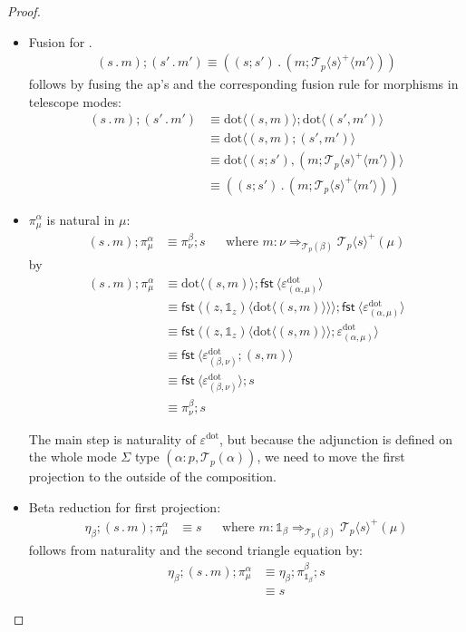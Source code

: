 \documentclass[10pt]{article}
\theoremstyle{definition}
\newcommand\dsd[1]{\ensuremath{\mathsf{#1}}}
\newcommand{\tcell}{\Rightarrow}
\newcommand{\app}[2]{\ensuremath{#1 \: #2}}
\newcommand{\sigmacl}[3]{\ensuremath{(#1{:}#2,#3)}}
\newcommand{\fst}[1]{\app{\dsd{fst}}{#1}}
\newcommand\TrPlus[2]{\ensuremath{{#1}^+(#2)}}
\newcommand\El[2]{\mathcal{T}_{#1}(#2)}
\newcommand\ApEl[2]{\mathcal{T}_{#1}\langle#2\rangle}
\newcommand\bdot[0]{\mathbin{.}}
\newcommand\ap[2]{\ensuremath{#1 \langle #2 \rangle }}
\newcommand\ApPlus[2]{\ensuremath{{#1}^+ \langle #2 \rangle }}
\newcommand{\sdot}{\ensuremath{\mathrm{dot}}}
\newcommand\One{\ensuremath{\mathds{1}}}
\begin{document}
\begin{proof}~
\begin{itemize}
\item Fusion for $.$
\begin{align}
\label{dot-fusion}
    (s \bdot m);(s' \bdot m') \equiv ((s;s') \bdot (m;\ApPlus{\ApEl{p}{s}} {m'}))
\end{align}
follows by fusing the ap's and the corresponding fusion rule for morphisms in telescope modes:
\begin{align*}
(s \bdot m);(s' \bdot m') &\equiv \ap{\sdot}{(s, m)} ; \ap{\sdot}{(s', m')} \\
&\equiv \ap{\sdot}{(s, m);(s', m')} \\
&\equiv \ap{\sdot}{(s;s'), (m;\ApPlus{\ApEl{p}{s}} {m'})} \\
&\equiv ((s;s') \bdot (m;\ApPlus{\ApEl{p}{s}} {m'}))
\end{align*}

\item $\pi^\alpha_\mu$ is natural in $\mu$:
  \begin{align}
  \label{pi-naturality}
  (s \bdot m); \pi^\alpha_\mu &\equiv \pi^\beta_\nu;s && \text{where }
  {m} : {\nu} \tcell_{\El{p}{\beta}} {\TrPlus{\ApEl{p}{s}}{\mu}}
  \end{align}
  by
  \begin{align*}
  (s \bdot m); \pi^\alpha_\mu 
  &\equiv \ap{\sdot}{(s, m)} ; \ap \fst {\varepsilon^\sdot_{(\alpha, \mu)}} \\  
  &\equiv \ap{\fst}{\ap{(z,\One_z)}{\ap{\sdot}{(s, m)}}} ; \ap \fst {\varepsilon^\sdot_{(\alpha, \mu)}} \\
  &\equiv \ap{\fst}{\ap{(z,\One_z)}{\ap{\sdot}{(s, m)}} ; \varepsilon^\sdot_{(\alpha, \mu)}}  \\
  &\equiv \ap{\fst}{\varepsilon^\sdot_{(\beta, \nu)}; (s, m) } \\
  &\equiv \ap{\fst}{\varepsilon^\sdot_{(\beta, \nu)}} ; s\\
  &\equiv \pi^\beta_\nu ; s
  \end{align*}

The main step is naturality of $\varepsilon^\sdot$, but because the adjunction
is defined on the whole mode $\Sigma$ type \sigmacl{\alpha}{p}{\El p
  \alpha}, we need to move the first projection to the outside of the
composition.
  
\item Beta reduction for first projection:
  \begin{align}
\label{beta-pi}
\eta_\beta;(s \bdot m);\pi^\alpha_\mu &\equiv s && \text{where } {m} : {\One_\beta} \tcell_{\El p \beta} {\TrPlus{\ApEl{p}{s}}{\mu}}
  \end{align}
follows from naturality and the second triangle equation by:
\begin{align*}
\eta_\beta;(s \bdot m);\pi^\alpha_\mu
&\equiv \eta_\beta;\pi^\beta_{\One_\beta};s \\
&\equiv s
\end{align*}


\end{itemize}
\end{proof}
\end{document}
